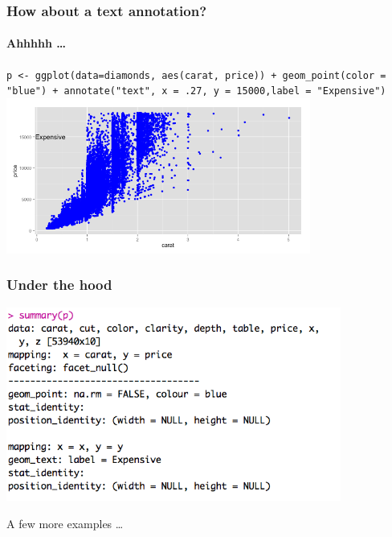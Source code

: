 \documentclass{beamer}
\begin{document}
\begin{frame}\frametitle{How about a text annotation?}
\framesubtitle{Ahhhhh \ldots}
\footnotesize\texttt{p <- ggplot(data=diamonds, aes(carat, price)) + geom\_point(color = "blue") + annotate("text", x = .27, y = 15000,label = "Expensive")} 
\includegraphics[width=100mm,scale=0.5]{rightannotate.png}
\end{frame}

\begin{frame}\frametitle{Under the hood}
\includegraphics[width=110mm,scale=0.5]{hoodannotate.png}
\end{frame}






\begin{frame}
A few more examples \ldots
\end{frame}
\end{document}
